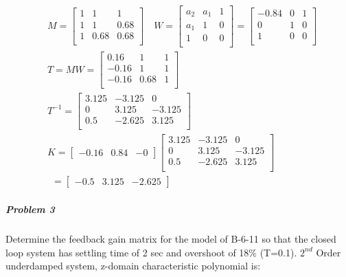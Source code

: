 \begin{align*}
& M = \begin{bmatrix} 
1 & 1    &  1     \\ 
1 & 1    &   0.68 \\ 
1 & 0.68 &   0.68 \\ \end{bmatrix} \quad W = \begin{bmatrix} 
a_2 & a_1    &  1 \\ 
a_1 & 1      &  0 \\ 
1   & 0      &  0 \\ \end{bmatrix} = \begin{bmatrix} 
-0.84 & 0      &  1 \\ 
0     & 1      &  0 \\ 
1     & 0      &  0 \\ \end{bmatrix} \\
& T = MW = \begin{bmatrix} 
 0.16     & 1      &  1 \\ 
-0.16     & 1      &  1 \\ 
-0.16     & 0.68   &  1 \\ \end{bmatrix} \\
& T^{-1} = \begin{bmatrix} 
3.125     & -3.125      &  0 \\ 
0         & 3.125       &  -3.125 \\ 
0.5       & -2.625      &  3.125 \\ \end{bmatrix} \\
& K = \begin{bmatrix}
-0.16 & 0.84 & -0 
\end{bmatrix}\begin{bmatrix} 
3.125     & -3.125      &  0 \\ 
0         & 3.125       &  -3.125 \\ 
0.5       & -2.625      &  3.125 \\ \end{bmatrix} \\
& \ \ = \begin{bmatrix}
-0.5 & 3.125 & -2.625 
\end{bmatrix}
\end{align*}
\subparagraph*{Problem 3}
Determine the feedback gain matrix for the model of B-6-11 so that the closed loop system has settling time of 2 sec and overshoot of 18\% (T=0.1). \hfill \linebreak 
$2^{nd}$ Order underdamped system, z-domain characteristic polynomial is: \hfill \linebreak

